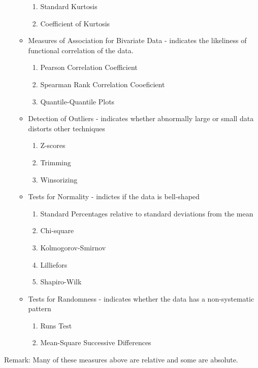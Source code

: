 \documentclass[10pt,]{book}
\theoremstyle{plain}
\theoremstyle{definition}
\theoremstyle{definition}
\theoremstyle{definition}
\numberwithin{equation}{section}
\begin{document}
\begin{itemize}[label=\textbullet]
\begin{itemize}[label=$\circ$]
\begin{enumerate}
\item\hypertarget{li-25}{}Standard Kurtosis%
\item\hypertarget{li-26}{}Coefficient of Kurtosis%
\end{enumerate}
%
\item{}Measures of Association for Bivariate Data 
			- indicates the likeliness of functional correlation of the data.
\begin{enumerate}
\item\hypertarget{li-28}{}Pearson Correlation Coefficient%
\item\hypertarget{li-29}{}Spearman Rank Correlation Cooeficient%
\item\hypertarget{li-30}{}Quantile-Quantile Plots%
\end{enumerate}
%
\item{}Detection of Outliers 
			- indicates whether abnormally large or small data distorts other 
			techniques
\begin{enumerate}
\item\hypertarget{li-32}{}Z-scores%
\item\hypertarget{li-33}{}Trimming%
\item\hypertarget{li-34}{}Winsorizing%
\end{enumerate}
%
\item{}Tests for Normality 
			- indictes if the data is bell-shaped
\begin{enumerate}
\item\hypertarget{li-36}{}Standard Percentages relative to standard deviations from the mean%
\item\hypertarget{li-37}{}Chi-square%
\item\hypertarget{li-38}{}Kolmogorov-Smirnov%
\item\hypertarget{li-39}{}Lilliefors%
\item\hypertarget{li-40}{}Shapiro-Wilk%
\end{enumerate}
%
\item{}Tests for Randomness 
			- indicates whether the data has a non-systematic pattern
\begin{enumerate}
\item\hypertarget{li-42}{}Runs Test%
\item\hypertarget{li-43}{}Mean-Square Successive Differences%
\end{enumerate}
%
\end{itemize}
%
\end{itemize}
Remark: Many of these measures above are relative and some are absolute.%
\typeout{************************************************}
\typeout{************************************************}
\end{document}
